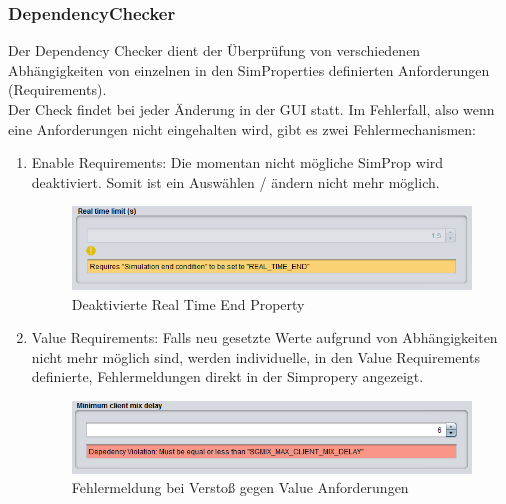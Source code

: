\documentclass[a4paper, 11pt]{article} %
\begin{document}
\subsubsection{DependencyChecker}
\label{sssub:dependencychecker}
Der Dependency Checker dient der Überprüfung von verschiedenen Abhängigkeiten von einzelnen in den SimProperties definierten Anforderungen (Requirements).\\

Der Check findet bei jeder Änderung in der GUI statt. Im Fehlerfall, also wenn eine Anforderungen nicht eingehalten wird, gibt es zwei Fehlermechanismen:
\begin{enumerate}
	\item Enable Requirements: Die momentan nicht mögliche SimProp wird deaktiviert. Somit ist ein Auswählen / ändern nicht mehr möglich.

\begin{figure}[!htp]
\includegraphics[width=\textwidth,scale=0.5]{img/DependencyChecker_RealTimeDisabled}
\caption{Deaktivierte Real Time End Property}
\label{fig:deactivatedRealTimeEnd}
\end{figure}

	\item Value Requirements: Falls neu gesetzte Werte aufgrund von Abhängigkeiten nicht mehr möglich sind, werden individuelle, in den Value Requirements definierte, Fehlermeldungen direkt in der Simpropery angezeigt.
	
	\begin{figure}[!htp]
\includegraphics[width=\textwidth,scale=0.5]{img/DependencyChecker_MiniumClientMixDelayError}
\caption{Fehlermeldung bei Verstoß gegen Value Anforderungen}
\label{fig:errorMessageValueRequirement}
\end{figure}
\end{enumerate}

\end{document}
